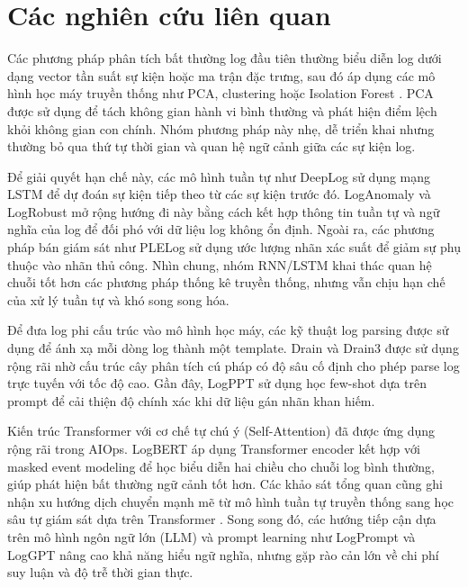 \documentclass[conference]{IEEEtran}
\begin{document}
\section{Các nghiên cứu liên quan}
Các phương pháp phân tích bất thường log đầu tiên thường biểu diễn log dưới dạng vector tần suất sự kiện hoặc ma trận đặc trưng, sau đó áp dụng các mô hình học máy truyền thống như PCA, clustering hoặc Isolation Forest \cite{b10,b11}. PCA được sử dụng để tách không gian hành vi bình thường và phát hiện điểm lệch khỏi không gian con chính. Nhóm phương pháp này nhẹ, dễ triển khai nhưng thường bỏ qua thứ tự thời gian và quan hệ ngữ cảnh giữa các sự kiện log.

Để giải quyết hạn chế này, các mô hình tuần tự như DeepLog \cite{b1} sử dụng mạng LSTM để dự đoán sự kiện tiếp theo từ các sự kiện trước đó. LogAnomaly \cite{b13} và LogRobust \cite{b14} mở rộng hướng đi này bằng cách kết hợp thông tin tuần tự và ngữ nghĩa của log để đối phó với dữ liệu log không ổn định. Ngoài ra, các phương pháp bán giám sát như PLELog \cite{b15} sử dụng ước lượng nhãn xác suất để giảm sự phụ thuộc vào nhãn thủ công. Nhìn chung, nhóm RNN/LSTM khai thác quan hệ chuỗi tốt hơn các phương pháp thống kê truyền thống, nhưng vẫn chịu hạn chế của xử lý tuần tự và khó song song hóa.

Để đưa log phi cấu trúc vào mô hình học máy, các kỹ thuật log parsing được sử dụng để ánh xạ mỗi dòng log thành một template. Drain \cite{b3} và Drain3 được sử dụng rộng rãi nhờ cấu trúc cây phân tích cú pháp có độ sâu cố định cho phép parse log trực tuyến với tốc độ cao. Gần đây, LogPPT \cite{b7} sử dụng học few-shot dựa trên prompt để cải thiện độ chính xác khi dữ liệu gán nhãn khan hiếm.

Kiến trúc Transformer với cơ chế tự chú ý (Self-Attention) \cite{b4} đã được ứng dụng rộng rãi trong AIOps. LogBERT \cite{b2} áp dụng Transformer encoder kết hợp với masked event modeling để học biểu diễn hai chiều cho chuỗi log bình thường, giúp phát hiện bất thường ngữ cảnh tốt hơn. Các khảo sát tổng quan cũng ghi nhận xu hướng dịch chuyển mạnh mẽ từ mô hình tuần tự truyền thống sang học sâu tự giám sát dựa trên Transformer \cite{b16}. Song song đó, các hướng tiếp cận dựa trên mô hình ngôn ngữ lớn (LLM) và prompt learning như LogPrompt \cite{b8} và LogGPT \cite{b9} nâng cao khả năng hiểu ngữ nghĩa, nhưng gặp rào cản lớn về chi phí suy luận và độ trễ thời gian thực.
\end{document}
